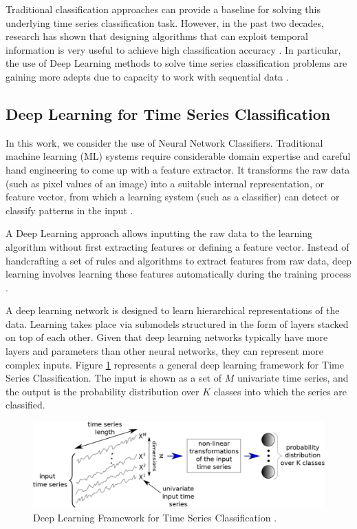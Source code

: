 Traditional classification approaches can provide a baseline for solving this underlying time series classification task. However, in the past two decades, research has shown that designing algorithms that can exploit temporal information is very useful to achieve high classification accuracy \cite{Wang2017}. In particular, the use of Deep Learning methods to solve time series classification problems are gaining more adepts due to capacity to work with sequential data \cite{Bagnall2017a, Zhao2017, Zebik2017}.

\subsection{Deep Learning for Time Series Classification}
\label{Sec:DL-TSC}
In this work, we consider the use of Neural Network Classifiers. Traditional machine learning (ML) systems require considerable domain expertise and careful hand engineering to come up with a feature extractor. It transforms the raw data (such as pixel values of an image) into a suitable internal representation, or feature vector, from which a learning system (such as a classifier) can detect or classify patterns in the input \cite{Guyon2006}. 

A Deep Learning approach allows inputting the raw data to the learning algorithm without first extracting features or defining a feature vector. Instead of handcrafting a set of rules and algorithms to extract features from raw data, deep learning involves learning these features automatically during the training process \cite{Goodfellow2016, Schmidhuber2015}. 

A deep learning network is designed to learn hierarchical representations of the data. Learning takes place via submodels structured in the form of layers stacked on top of each other. Given that deep learning networks typically have more layers and parameters than other neural networks, they can represent more complex inputs. Figure \ref{Fig:TSC-Fawaz} represents a general deep learning framework for Time Series Classification. The input is shown as a set of $M$ univariate time series, and the output is the probability distribution over $K$ classes into which the series are classified.

\begin{figure}[htb]
 	\centering
 	\includegraphics[scale=0.5]{../Figures/TSC_Fawaz}
 	\caption{Deep Learning Framework for Time Series Classification \cite{Fawaz2019}.}
 	\label{Fig:TSC-Fawaz}
\end{figure}

